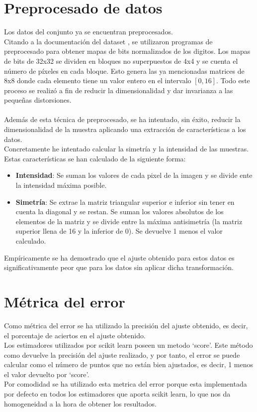 \section{Preprocesado de datos}
Los datos del conjunto ya se encuentran preprocesados.\\
Citando a la documentación del dataset \cite{Optical} , se utilizaron programas de preprocesado  para obtener mapas de bits normalizados de los digitos. Los mapas de bits de 32x32 se dividen en bloques no superpuestos de 4x4 y se cuenta el número de píxeles en cada bloque. Esto genera las ya mencionadas matrices de 8x8 donde cada elemento tiene un valor entero en el intervalo $[0,16]$. Todo este proceso se realizó a fin de reducir la dimensionalidad y dar invarianza a las pequeñas distorsiones.\\
\\
Además de esta técnica de preprocesado, se ha intentado, sin éxito, reducir la dimensionalidad de la muestra aplicando una extracción de características a los datos.\\
Concretamente he intentado calcular la simetría y la intensidad de las muestras.\\
Estas características se han calculado de la siguiente forma:
\begin{itemize}
   \item \textbf{Intensidad}: Se suman los valores de cada pixel de la imagen y se divide ente la intensidad máxima posible.
   \item \textbf{Simetría}: Se extrae la matriz triangular superior e inferior sin tener en cuenta la diagonal y se restan. Se suman los valores absolutos de los elementos de la matriz y se divide entre la máxima antisimetría (la matriz superior llena de 16 y la inferior de 0). Se devuelve 1 menos el valor calculado.
\end{itemize}
Empíricamente se ha demostrado que el ajuste obtenido para estos datos es significativamente peor que para los datos sin aplicar dicha transformación.

\section{Métrica del error}
Como métrica del error se ha utilizado la precisión del ajuste obtenido, es decir, el porcentaje de aciertos en el ajuste obtenido.\\
Los estimadores utilizados por scikit learn \cite{SGDClassifier} \cite{logisticRegression} poseen un metodo `score'. Este método como devuelve la precisión del ajuste realizado, y por tanto, el error se puede calcular como el número de puntos que no están bien ajustados, es decir, 1 menos el valor devuelto por `score'.\\
Por comodidad se ha utilizado esta metrica del error porque esta implementada por defecto en todos los estimadores que aporta scikit learn, lo que nos da homogeneidad a la hora de obtener los resultados.

